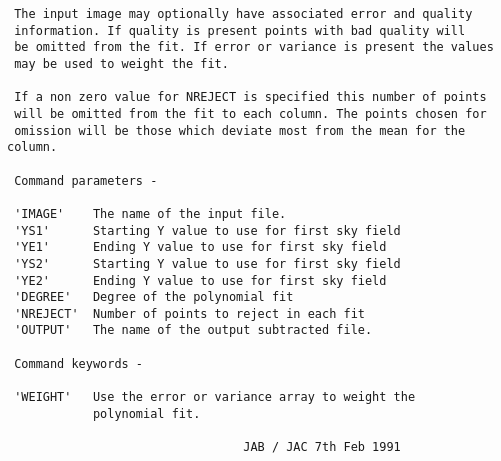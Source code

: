 \begin{description}
\begin{verbatim}
 The input image may optionally have associated error and quality
 information. If quality is present points with bad quality will
 be omitted from the fit. If error or variance is present the values
 may be used to weight the fit.

 If a non zero value for NREJECT is specified this number of points
 will be omitted from the fit to each column. The points chosen for
 omission will be those which deviate most from the mean for the column.

 Command parameters -

 'IMAGE'    The name of the input file.
 'YS1'      Starting Y value to use for first sky field
 'YE1'      Ending Y value to use for first sky field
 'YS2'      Starting Y value to use for first sky field
 'YE2'      Ending Y value to use for first sky field
 'DEGREE'   Degree of the polynomial fit
 'NREJECT'  Number of points to reject in each fit
 'OUTPUT'   The name of the output subtracted file.

 Command keywords -

 'WEIGHT'   Use the error or variance array to weight the
            polynomial fit.

                                 JAB / JAC 7th Feb 1991
\end{verbatim}
\end{description}
